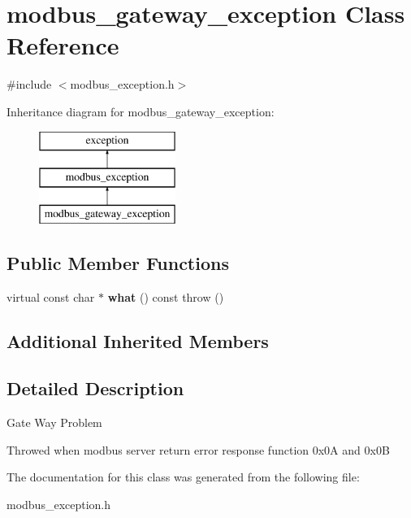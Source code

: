 \hypertarget{classmodbus__gateway__exception}{}\section{modbus\+\_\+gateway\+\_\+exception Class Reference}
\label{classmodbus__gateway__exception}


{\ttfamily \#include $<$modbus\+\_\+exception.\+h$>$}

Inheritance diagram for modbus\+\_\+gateway\+\_\+exception\+:\begin{figure}[H]
\begin{center}
\leavevmode
\includegraphics[height=3.000000cm]{classmodbus__gateway__exception}
\end{center}
\end{figure}
\subsection*{Public Member Functions}
\begin{DoxyCompactItemize}
\item 
\mbox{\label{classmodbus__gateway__exception_a8cab9924e8f3879a50ce0ad58197bc24}} 
virtual const char $\ast$ {\bfseries what} () const  throw ()
\end{DoxyCompactItemize}
\subsection*{Additional Inherited Members}


\subsection{Detailed Description}
Gate Way Problem

Throwed when modbus server return error response function 0x0A and 0x0B 

The documentation for this class was generated from the following file\+:\begin{DoxyCompactItemize}
\item 
modbus\+\_\+exception.\+h\end{DoxyCompactItemize}
